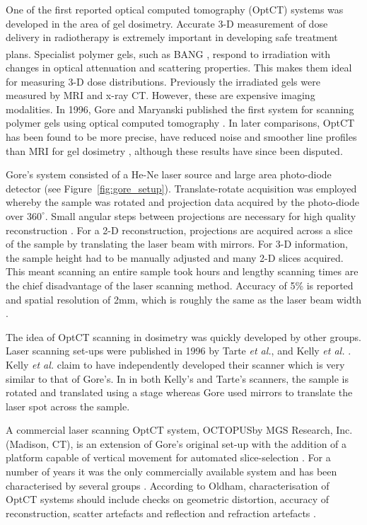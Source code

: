 \documentclass[12pt]{article}
\begin{document}
One of the first reported optical computed tomography (OptCT) systems was developed in the area of gel dosimetry. Accurate 3-D measurement of dose delivery in radiotherapy is extremely important in developing safe treatment plans. Specialist polymer gels, such as BANG\textsuperscript{\textregistered} \cite{Maryanski:1996}, respond to irradiation with changes in optical attenuation and scattering properties.  This makes them ideal for measuring 3-D dose distributions. Previously the irradiated gels were measured by MRI and x-ray CT. However, these are expensive imaging modalities. In 1996, Gore and Maryanski published the first system for scanning polymer gels using optical computed tomography \cite{Gore:1999tg}. In later comparisons, OptCT has been found to be more precise, have reduced noise and smoother line profiles than MRI for gel dosimetry \cite{Oldham:2001gs}, although these results have since been disputed. 

Gore's system consisted of a  He-Ne laser source and large area photo-diode detector (see Figure~\ref{fig:gore_setup}). Translate-rotate acquisition was employed whereby the sample was rotated and projection data  acquired  by the photo-diode over $360^{\circ}$. Small angular steps between projections are necessary for high quality reconstruction \cite{russ2002image}. For a 2-D reconstruction, projections are acquired across a slice of the sample by translating the laser beam with mirrors. For 3-D information, the sample height  had to be manually adjusted and many 2-D slices acquired. This meant scanning an entire sample took  hours and lengthy scanning times are the chief disadvantage of the laser scanning method.  Accuracy of 5\% is reported and spatial resolution of 2mm, which is roughly the same as the laser beam width \cite{Gore:1999tg}.

The idea of OptCT scanning in dosimetry was quickly developed by other groups. Laser scanning set-ups were published in 1996 by Tarte \textit{et al.},  \cite{Tarte:2006} and Kelly \textit{et al.}  \cite{Kelly:1998}.
Kelly \textit{et al.} claim to have independently developed their scanner which is very similar to that of Gore's. In in both Kelly's and Tarte's  scanners, the sample is rotated and translated using a stage whereas Gore used mirrors to translate the laser spot across the sample. 


A commercial laser scanning OptCT system, OCTOPUS\texttrademark by MGS Research, Inc.
(Madison, CT),  is an extension of Gore's original set-up with the addition of a platform capable of vertical movement for automated slice-selection \cite{Islam:2003gs}. For a number of years it was the only commercially available system and has been characterised by several groups \cite{Xu:2003cc, Islam:2003gs, Xu:2004iv, Sakhalkar:2009hb}. According to Oldham, characterisation of OptCT systems should include checks on geometric distortion, accuracy of reconstruction, scatter artefacts and reflection and refraction artefacts \cite{Oldham:2004cj}.
\end{document}
